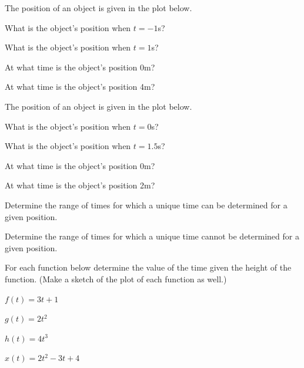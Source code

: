\begin{problem}
\item The position of an object is given in the plot below.

  \scalebox{0.55}{}

  \begin{subproblem}
    \item What is the object's position when $t=-1$s?
      \vfill

    \item What is the object's position when $t=1$s?
      \vfill

    \item At what time is the object's position 0m?
      \vfill

    \item At what time is the object's position 4m?
      \vfill

  \end{subproblem}

  \clearpage

\item The position of an object is given in the plot below.

  \scalebox{0.55}{}

  \begin{subproblem}
    \item What is the object's position when $t=0$s?
      \vfill

    \item What is the object's position when $t=1.5$s?
      \vfill

    \item At what time is the object's position 0m?
      \vfill

    \item At what time is the object's position 2m?
      \vfill

    \item Determine the range of times for which a unique time can be
      determined for a given position.
      \vfill

    \item Determine the range of times for which a unique time cannot be
      determined for a given position.
      \vfill

  \end{subproblem}

  \clearpage

\item For each function below determine the value of the time given
  the height of the function. (Make a sketch of the plot of each
  function as well.)

  \begin{subproblem}
  \item $f(t)=3t+1$
    \vfill
  \item $g(t)=2t^2$
    \vfill
  \item $h(t)=4t^3$
    \vfill
  \item $x(t)=2t^2 - 3t + 4$
    \vfill
  \end{subproblem}

\end{problem}

